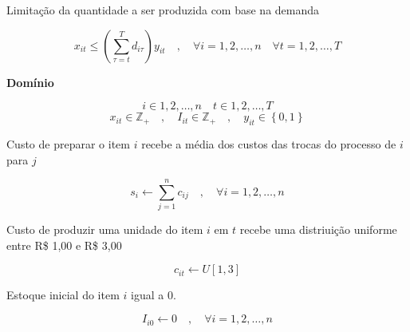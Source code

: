 \documentclass[12pt]{scrartcl}
\begin{document}
Limitação da quantidade a ser produzida com base na demanda 

\[ x_{it} \leq \left(\sum_{\tau = t}^{T} d_{i\tau}\right) y_{it} \quad , \quad \forall i = {1, 2, \dots, n} \quad \forall t = {1, 2, \dots, T} \]

\textbf{Domínio}

\[ i \in {1, 2, \dots, n} \quad t \in {1, 2, \dots, T} \]
\[ x_{it} \in \mathbb{Z}_+ \quad , \quad I_{it} \in \mathbb{Z}_+ \quad , \quad y_{it} \in \left\{0, 1\right\} \]

\newpage

\centering

Custo de preparar o item $i$ recebe a média dos custos das trocas do processo de $i$ para $j$

\[ s_i \leftarrow \sum_{j = 1}^{n} c_{ij} \quad , \quad \forall i = {1, 2, \dots, n} \]

Custo de produzir uma unidade do item $i$ em $t$ recebe uma distriuição uniforme entre R\$ 1,00 e R\$ 3,00 

\[ c_{it} \leftarrow U [1, 3] \]

Estoque inicial do item $i$ igual a $0$.

\[ I_{i0} \leftarrow 0 \quad , \quad \forall i = {1, 2, \dots, n} \]
\end{document}
